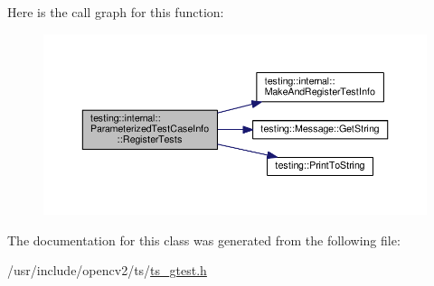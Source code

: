Here is the call graph for this function\-:\nopagebreak
\begin{figure}[H]
\begin{center}
\leavevmode
\includegraphics[width=350pt]{classtesting_1_1internal_1_1ParameterizedTestCaseInfo_a7e118820b3074ce70c0440e2e49a50a1_cgraph}
\end{center}
\end{figure}




The documentation for this class was generated from the following file\-:\begin{DoxyCompactItemize}
\item 
/usr/include/opencv2/ts/\hyperlink{ts__gtest_8h}{ts\-\_\-gtest.\-h}\end{DoxyCompactItemize}
